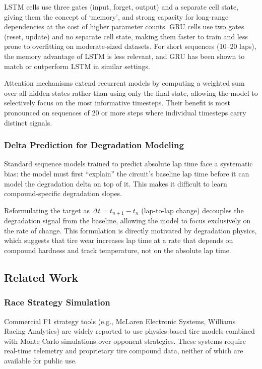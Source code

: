 LSTM cells use three gates (input, forget, output) and a separate cell state, giving them the concept of `memory', and strong capacity for long-range
 dependencies at the cost of higher parameter counts. GRU cells use two gates (reset, update) and no separate cell state,
  making them faster to train and less prone to overfitting on moderate-sized datasets. For short sequences (10--20 laps),
   the memory advantage of LSTM is less relevant, and GRU has been shown to match or outperform LSTM in similar settings\cite{chung2014}.

Attention mechanisms\cite{bahdanau2015} extend recurrent models by computing a weighted sum over 
all hidden states rather than using only the final state, allowing the model to selectively focus on the most 
informative timesteps. Their benefit is most pronounced on sequences of 20 or more steps where individual timesteps 
carry distinct signals.

\subsubsection{Delta Prediction for Degradation Modeling}

Standard sequence models trained to predict absolute lap time face a systematic bias: the model must first ``explain'' 
the circuit's baseline lap time before it can model the degradation delta on top of it. This makes it difficult to learn 
compound-specific degradation slopes.

Reformulating the target as $\Delta t = t_{n+1} - t_n$ (lap-to-lap change) decouples the degradation signal from the baseline, 
allowing the model to focus exclusively on the rate of change. This formulation is directly motivated by degradation physics, which suggests that
tire wear increases lap time at a rate that depends on compound hardness and track temperature, not on the absolute lap time.

\subsection{Related Work}

\subsubsection{Race Strategy Simulation}

Commercial F1 strategy tools (e.g., McLaren Electronic Systems, Williams Racing Analytics) are widely reported to use physics-based tire models combined with Monte Carlo simulations over opponent strategies. These systems require real-time telemetry and proprietary tire compound data, neither of which are available for public use.

